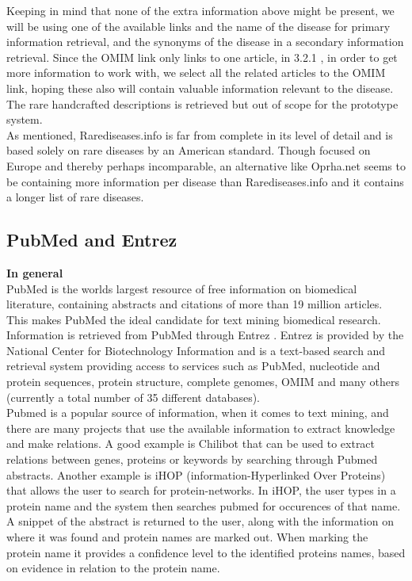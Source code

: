 Keeping in mind that none of the extra information above might be
present, we will be using one of the available links and the name of
the disease for primary information retrieval, and the synonyms of the
disease in a secondary information retrieval. Since the OMIM link only
links to one article, in 3.2.1 , in order to get more
information to work with, we select all the related articles to the
OMIM link, hoping these also will contain valuable information
relevant to the disease. The rare handcrafted descriptions is
retrieved but out of scope for the prototype
system.  \\

As mentioned, Rarediseases.info is far from complete in its level of detail and is based solely on rare diseases by an American standard. Though focused on Europe and thereby perhaps incomparable, an alternative like Oprha.net seems to be containing more information per disease than Rarediseases.info and it contains a longer list of rare diseases.

\subsection{PubMed and Entrez\label{PubmedEntrez}}

\textbf{In general} \\
PubMed \cite{PubMedFactSheet} is the worlds largest resource of free
information on biomedical literature, containing abstracts and
citations of more than 19 million articles. This makes PubMed the
ideal candidate for text mining biomedical research.\\

Information is retrieved from PubMed through Entrez
\cite{Entrez}. Entrez is provided by the National Center for
Biotechnology Information \cite{NCBIFactSheet} and is a text-based
search and retrieval system providing access to services such as
PubMed, nucleotide and protein sequences, protein structure, complete
genomes, OMIM and many others (currently a total number of 35
different databases).\\

Pubmed is a popular source of information, when it comes to text
mining, and there are many projects that use the available information
to extract knowledge and make relations. A good example is Chilibot
\cite{Chilibot} that can be used to extract relations between genes,
proteins or keywords by searching through Pubmed abstracts. Another
example is iHOP \cite{IHOP} (information-Hyperlinked Over Proteins)
that allows the user to search for protein-networks. In iHOP, the user
types in a protein name and the system then searches pubmed for
occurences of that name. A snippet of the abstract is returned to the
user, along with the information on where it was found and protein
names are marked out. When marking the protein name it provides a
confidence level to the identified proteins names, based on evidence
in relation to the protein name.\\

